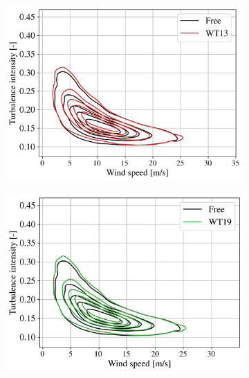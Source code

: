 \begin{figure}[h]
    \centering
    \begin{subfigure}[b]{0.3\textwidth}
        \includegraphics[width=\textwidth]{part2/figures/WAKE/joint_perturbation_SB_WT13.png}
    \end{subfigure}
    \begin{subfigure}[b]{0.3\textwidth}
        \includegraphics[width=\textwidth]{part2/figures/WAKE/joint_perturbation_SB_WT19.png}
    \end{subfigure}
    \begin{subfigure}[b]{0.3\textwidth}

\end{subfigure}
\end{figure}
